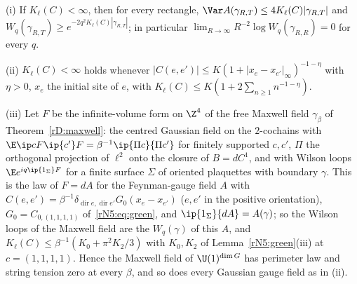 \begin{lemma}\label{rN5:gaussloop}
\textup{(i)} If $K_\ell(C)<\infty$, then for every rectangle,
$\Var A(\gamma_{R,T})\le4K_\ell(C)|\gamma_{R,T}|$ and $W_q(\gamma_{R,T})\ge
e^{-2q^2K_\ell(C)|\gamma_{R,T}|}$; in particular $\lim_{R\to\infty}R^{-2}\log
W_q(\gamma_{R,R})=0$ for every $q$.

\textup{(ii)} $K_\ell(C)<\infty$ holds whenever $|C(e,e')|\le K(1+|x_e-x_{e'}|
_\infty)^{-1-\eta}$ with $\eta>0$, $x_e$ the initial site of $e$, with
$K_\ell(C)\le K(1+2\sum_{n\ge1}n^{-1-\eta})$.

\textup{(iii)} Let $F$ be the infinite-volume form on $\Z^4$ of the free
Maxwell field $\gamma_\beta$ of Theorem~\textup{\ref{rD:maxwell}}: the
centred Gaussian field on the $2$-cochains with $\E\ip cF\ip{c'}F=\beta^{-1}
\ip{\Pi c}{\Pi c'}$ for finitely supported $c,c'$, $\Pi$ the orthogonal
projection of $\ell^2$ onto the closure of $B=dC^1$, and with Wilson loops
$\E e^{iq\ip{1_\Sigma}F}$ for a finite surface $\Sigma$ of oriented
plaquettes with boundary $\gamma$. This is the law of $F=dA$ for the
Feynman-gauge field $A$ with $C(e,e')=\beta^{-1}\delta_{\operatorname{dir}e,
\operatorname{dir}e'}G_0(x_e-x_{e'})$ \textup{(}$e,e'$ in the positive
orientation\textup{)}, $G_0=C_{0,(1,1,1,1)}$ of~\eqref{rN5:eq:green}, and
$\ip{1_\Sigma}{dA}=A(\gamma)$; so the Wilson loops of the Maxwell field are
the $W_q(\gamma)$ of this $A$, and $K_\ell(C)\le\beta^{-1}(K_0+\pi^2K_2/3)$
with $K_0,K_2$ of Lemma~\textup{\ref{rN5:green}(iii)} at $c=(1,1,1,1)$.
Hence the Maxwell field of $\U(1)^{\dim G}$ has perimeter law and string
tension zero at every $\beta$, and so does every Gaussian gauge field as in
\textup{(ii)}.
\end{lemma}

